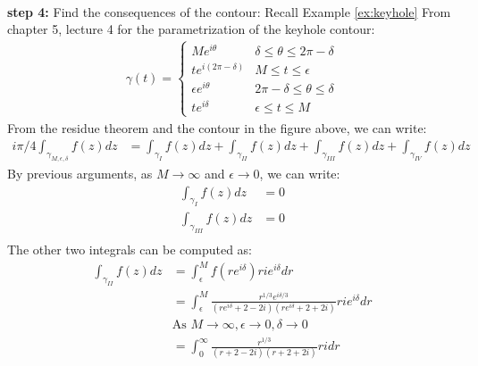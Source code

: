 \begin{example}
\begin{align*}
    \end{align*}
    \textbf{step 4:} Find the consequences of the contour:
    Recall Example \ref{ex:keyhole} From chapter 5, lecture 4 for the parametrization of the keyhole contour:
    \begin{align*}
        \gamma (t) = \begin{cases}
                         Me^{i\theta}          & \delta \leq \theta \leq 2\pi - \delta \\
                         te^{i(2\pi - \delta)} & M \leq t \leq \epsilon                \\
                         \epsilon e^{i\theta}  & 2\pi - \delta \leq \theta \leq \delta \\
                         te^{i\delta}          & \epsilon \leq t \leq M
                     \end{cases}
    \end{align*}
    From the residue theorem and the contour in the figure above, we can write:
    \begin{align*}
        i\pi/4\int_{\gamma_{M,\epsilon,\delta}} f(z)dz & = \int_{\gamma_I} f(z)dz + \int_{\gamma_{II}} f(z)dz + \int_{\gamma_{III}} f(z)dz + \int_{\gamma_{IV}} f(z)dz
    \end{align*}
    By previous arguments, as $M \to \infty$ and $\epsilon \to 0$, we can write:
    \begin{align*}
        \int_{\gamma_{I}} f(z)dz   & = 0 \\
        \int_{\gamma_{III}} f(z)dz & = 0 \\
    \end{align*}
    The other two integrals can be computed as:
    \begin{align*}
        \int_{\gamma_{II}} f(z)dz & = \int_{\epsilon}^{M} f(r e^{i\delta})r i e^{i\delta} dr                                                              \\
                                  & = \int_{\epsilon}^{M} \frac{r^{1/3}e^{i\delta/3}}{(r e^{i\delta} + 2 - 2i)(r e^{i\delta} + 2 + 2i)}r i e^{i\delta} dr \\
                                  & \text{As } M \to \infty, \epsilon \to 0, \delta \to 0                                                                 \\
                                  & = \int_{0}^{\infty} \frac{r^{1/3}}{(r + 2 - 2i)(r + 2 + 2i)}r i dr                                                    \\
    \end{align*}

\end{example}
